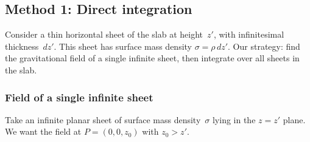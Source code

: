 \documentclass[11pt, letterpaper]{article}
\begin{document}
\subsection{Method 1: Direct integration}

Consider a thin horizontal sheet of the slab at height~$z'$, with infinitesimal thickness~$dz'$. This sheet has surface mass density $\sigma = \rho \, dz'$. Our strategy: find the gravitational field of a single infinite sheet, then integrate over all sheets in the slab.

\subsubsection{Field of a single infinite sheet}

Take an infinite planar sheet of surface mass density~$\sigma$ lying in the $z = z'$ plane. We want the field at $P = (0, 0, z_0)$ with $z_0 > z'$.

\end{document}
